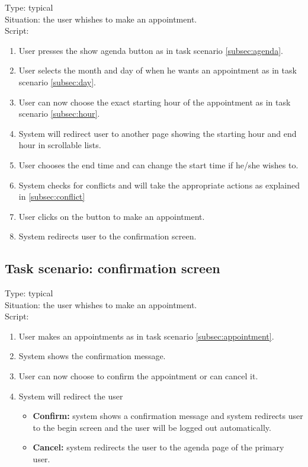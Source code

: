 \documentclass[11pt, a4paper,svglistings]{report}
\begin{document}
\label{subsec:appointment}Type: typical \\
Situation: the user whishes to make an appointment. \\
Script:
\begin{enumerate}
\item User presses the show agenda button as in task scenario \ref{subsec:agenda}.
\item User selects the month and day of when he wants an appointment as in task scenario \ref{subsec:day}.
\item User can now choose the exact starting hour of the appointment as in task scenario \ref{subsec:hour}.
\item System will redirect user to another page showing the starting hour and end hour in scrollable lists.
\item User chooses the end time and can change the start time if he/she wishes to.
\item System checks for conflicts and will take the appropriate actions as explained in \ref{subsec:conflict}
\item User clicks on the button to make an appointment.
\item System redirects user to the confirmation screen.
\end{enumerate}


\subsection{Task scenario: confirmation screen}


Type: typical \\
Situation: the user whishes to make an appointment. \\
Script:
\begin{enumerate}
\item User makes an appointments as in task scenario \ref{subsec:appointment}.
\item System shows the confirmation message.
\item User can now choose to confirm the appointment or can cancel it.
\item System will redirect the user
\begin{itemize}
\item \textbf{Confirm:} system shows a confirmation message and system redirects user to the begin screen and the user will be logged out automatically.
\item \textbf{Cancel:} system redirects the user to the agenda page of the primary user.
\end{itemize}
\end{enumerate}
\end{document}
